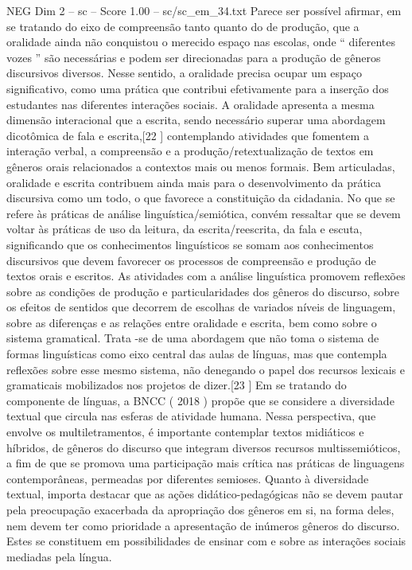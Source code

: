\begin{textsample}{NEG Dim 2 – sc – Score 1.00 – sc/sc\_em\_34.txt}
Parece ser possível afirmar, em se tratando do eixo de compreensão tanto quanto do de produção, que a oralidade ainda não conquistou o merecido espaço nas escolas, onde “ diferentes vozes ” são necessárias e podem ser direcionadas para a produção de gêneros discursivos diversos.
Nesse sentido, a oralidade precisa ocupar um espaço significativo, como uma prática que contribui efetivamente para a inserção dos estudantes nas diferentes interações sociais.
A oralidade apresenta a mesma dimensão interacional que a escrita, sendo necessário superar uma abordagem dicotômica de fala e escrita,[22 ] contemplando atividades que fomentem a interação verbal, a compreensão e a produção/retextualização de textos em gêneros orais relacionados a contextos mais ou menos formais.
Bem articuladas, oralidade e escrita contribuem ainda mais para o desenvolvimento da prática discursiva como um todo, o que favorece a constituição da cidadania.
No que se refere às práticas de análise linguística/semiótica, convém ressaltar que se devem voltar às práticas de uso da leitura, da escrita/reescrita, da fala e escuta, significando que os conhecimentos linguísticos se somam aos conhecimentos discursivos que devem favorecer os processos de compreensão e produção de textos orais e escritos.
As atividades com a análise linguística promovem reflexões sobre as condições de produção e particularidades dos gêneros do discurso, sobre os efeitos de sentidos que decorrem de escolhas de variados níveis de linguagem, sobre as diferenças e as relações entre oralidade e escrita, bem como sobre o sistema gramatical.
Trata -se de uma abordagem que não toma o sistema de formas linguísticas como eixo central das aulas de línguas, mas que contempla reflexões sobre esse mesmo sistema, não denegando o papel dos recursos lexicais e gramaticais mobilizados nos projetos de dizer.[23 ] Em se tratando do componente de línguas, a BNCC ( 2018 ) propõe que se considere a diversidade textual que circula nas esferas de atividade humana.
Nessa perspectiva, que envolve os multiletramentos, é importante contemplar textos midiáticos e híbridos, de gêneros do discurso que integram diversos recursos multissemióticos, a fim de que se promova uma participação mais crítica nas práticas de linguagens contemporâneas, permeadas por diferentes semioses.
Quanto à diversidade textual, importa destacar que as ações didático-pedagógicas não se devem pautar pela preocupação exacerbada da apropriação dos gêneros em si, na forma deles, nem devem ter como prioridade a apresentação de inúmeros gêneros do discurso.
Estes se constituem em possibilidades de ensinar com e sobre as interações sociais mediadas pela língua.

\end{textsample}
